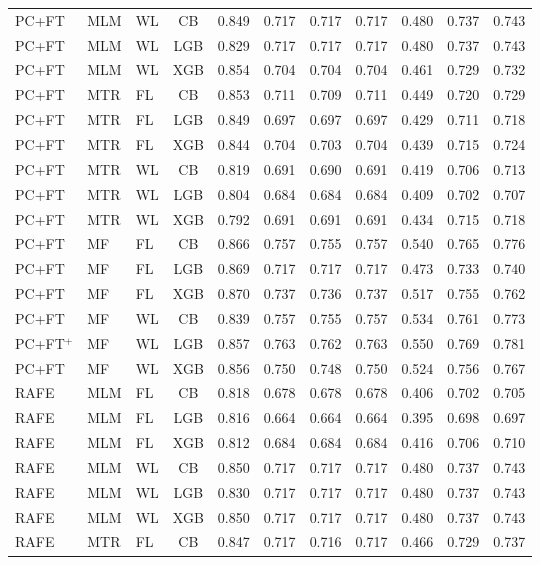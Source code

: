 \documentclass[9pt,a4paper]{article}
\begin{document}
\begin{scriptsize}
\begin{longtable}{lllcrrrrrrr}
PC+FT & MLM & WL & CB  & 0.849 & 0.717 & 0.717 & 0.717 & 0.480 & 0.737 & 0.743 \\
PC+FT & MLM & WL & LGB & 0.829 & 0.717 & 0.717 & 0.717 & 0.480 & 0.737 & 0.743 \\
PC+FT & MLM & WL & XGB & 0.854 & 0.704 & 0.704 & 0.704 & 0.461 & 0.729 & 0.732 \\
PC+FT & MTR & FL & CB  & 0.853 & 0.711 & 0.709 & 0.711 & 0.449 & 0.720 & 0.729 \\
PC+FT & MTR & FL & LGB & 0.849 & 0.697 & 0.697 & 0.697 & 0.429 & 0.711 & 0.718 \\
PC+FT & MTR & FL & XGB & 0.844 & 0.704 & 0.703 & 0.704 & 0.439 & 0.715 & 0.724 \\
PC+FT & MTR & WL & CB  & 0.819 & 0.691 & 0.690 & 0.691 & 0.419 & 0.706 & 0.713 \\
PC+FT & MTR & WL & LGB & 0.804 & 0.684 & 0.684 & 0.684 & 0.409 & 0.702 & 0.707 \\
PC+FT & MTR & WL & XGB & 0.792 & 0.691 & 0.691 & 0.691 & 0.434 & 0.715 & 0.718 \\
PC+FT & MF  & FL & CB  & 0.866 & 0.757 & 0.755 & 0.757 & 0.540 & 0.765 & 0.776 \\
PC+FT & MF  & FL & LGB & 0.869 & 0.717 & 0.717 & 0.717 & 0.473 & 0.733 & 0.740 \\
PC+FT & MF  & FL & XGB & 0.870 & 0.737 & 0.736 & 0.737 & 0.517 & 0.755 & 0.762 \\
PC+FT & MF  & WL & CB  & 0.839 & 0.757 & 0.755 & 0.757 & 0.534 & 0.761 & 0.773 \\
PC+FT$^+$ & MF & WL & LGB & 0.857 & 0.763 & 0.762 & 0.763 & 0.550 & 0.769 & 0.781 \\
PC+FT & MF  & WL & XGB & 0.856 & 0.750 & 0.748 & 0.750 & 0.524 & 0.756 & 0.767 \\
\midrule
RAFE & MLM & FL & CB  & 0.818 & 0.678 & 0.678 & 0.678 & 0.406 & 0.702 & 0.705 \\
RAFE & MLM & FL & LGB & 0.816 & 0.664 & 0.664 & 0.664 & 0.395 & 0.698 & 0.697 \\
RAFE & MLM & FL & XGB & 0.812 & 0.684 & 0.684 & 0.684 & 0.416 & 0.706 & 0.710 \\
RAFE & MLM & WL & CB  & 0.850 & 0.717 & 0.717 & 0.717 & 0.480 & 0.737 & 0.743 \\
RAFE & MLM & WL & LGB & 0.830 & 0.717 & 0.717 & 0.717 & 0.480 & 0.737 & 0.743 \\
RAFE & MLM & WL & XGB & 0.850 & 0.717 & 0.717 & 0.717 & 0.480 & 0.737 & 0.743 \\
RAFE & MTR & FL & CB  & 0.847 & 0.717 & 0.716 & 0.717 & 0.466 & 0.729 & 0.737 \\

\end{longtable}
\end{scriptsize}
\end{document}
